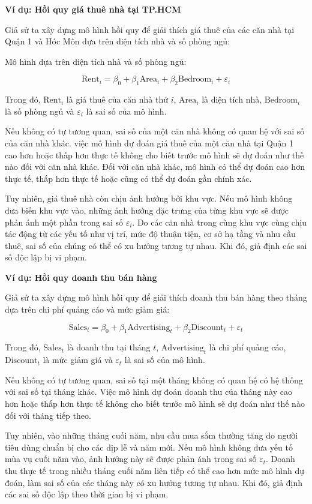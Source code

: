 \textbf{Ví dụ: Hồi quy giá thuê nhà tại TP.HCM}

Giả sử ta xây dựng mô hình hồi quy để giải thích giá thuê của các căn nhà tại Quận 1 và Hóc Môn dựa trên diện tích nhà và số phòng ngủ:

Mô hình dựa trên diện tích nhà và số phòng ngủ:

\[
\mathrm{Rent}_i
=
\beta_0
+
\beta_1 \mathrm{Area}_i
+
\beta_2 \mathrm{Bedroom}_i
+
\varepsilon_i
\]

Trong đó, $\mathrm{Rent}_i$ là giá thuê của căn nhà thứ $i$,
$\mathrm{Area}_i$ là diện tích nhà,
$\mathrm{Bedroom}_i$ là số phòng ngủ
và $\varepsilon_i$ là sai số của mô hình.

Nếu không có tự tương quan, sai số của một căn nhà không có quan hệ với sai số của căn nhà khác. việc mô hình dự đoán giá thuê của một căn nhà tại Quận 1 cao hơn hoặc thấp hơn thực tế không cho biết trước mô hình sẽ dự đoán như thế nào đối với căn nhà khác. Đối với căn nhà khác, mô hình có thể dự đoán cao hơn thực tế, thấp hơn thực tế hoặc cũng có thể dự đoán gần chính xác.

Tuy nhiên, giá thuê nhà còn chịu ảnh hưởng bởi khu vực. Nếu mô hình không đưa biến khu vực vào, những ảnh hưởng đặc trưng của từng khu vực sẽ được phản ánh một phần trong sai số $\varepsilon_i$. Do các căn nhà trong cùng khu vực cùng chịu tác động từ các yếu tố như vị trí, mức độ thuận tiện, cơ sở hạ tầng và nhu cầu thuê, sai số của chúng có thể có xu hướng tương tự nhau. Khi đó, giả định các sai số độc lập bị vi phạm.

\textbf{Ví dụ: Hồi quy doanh thu bán hàng}

Giả sử ta xây dựng mô hình hồi quy để giải thích doanh thu bán hàng theo tháng dựa trên chi phí quảng cáo và mức giảm giá:

\[
\mathrm{Sales}_t
=
\beta_0
+
\beta_1 \mathrm{Advertising}_t
+
\beta_2 \mathrm{Discount}_t
+
\varepsilon_t
\]

Trong đó, $\mathrm{Sales}_t$ là doanh thu tại tháng $t$, $\mathrm{Advertising}_t$ là chi phí quảng cáo, $\mathrm{Discount}_t$ là mức giảm giá và $\varepsilon_t$ là sai số của mô hình.

Nếu không có tự tương quan, sai số tại một tháng không có quan hệ có hệ thống với sai số tại tháng khác. Việc mô hình dự đoán doanh thu của tháng này cao hơn hoặc thấp hơn thực tế không cho biết trước mô hình sẽ dự đoán như thế nào đối với tháng tiếp theo.

Tuy nhiên, vào những tháng cuối năm, nhu cầu mua sắm thường tăng do người tiêu dùng chuẩn bị cho các dịp lễ và năm mới. Nếu mô hình không đưa yếu tố mùa vụ cuối năm vào, ảnh hưởng này sẽ được phản ánh trong sai số $\varepsilon_t$. Doanh thu thực tế trong nhiều tháng cuối năm liên tiếp có thể cao hơn mức mô hình dự đoán, làm sai số của các tháng này có xu hướng tương tự nhau. Khi đó, giả định các sai số độc lập theo thời gian bị vi phạm.


